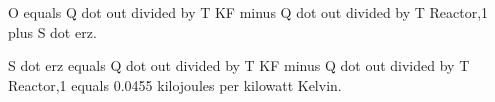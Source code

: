 O equals Q dot out divided by T KF minus Q dot out divided by T Reactor,1 plus S dot erz.  

S dot erz equals Q dot out divided by T KF minus Q dot out divided by T Reactor,1 equals 0.0455 kilojoules per kilowatt Kelvin.